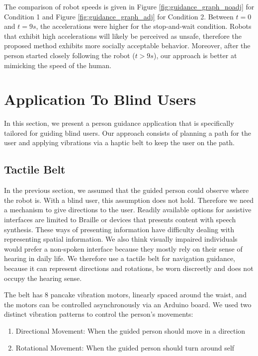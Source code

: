 The comparison of robot speeds is given in Figure \ref{fig:guidance_graph_noadj} for Condition 1 and Figure \ref{fig:guidance_graph_adj} for Condition 2. Between $t=0$ and $t=9s$, the accelerations were higher for the stop-and-wait condition. Robots that exhibit high accelerations will likely be perceived as unsafe, therefore the proposed method exhibits more socially acceptable behavior. Moreover, after the person started closely following the robot ($t >9s$), our approach is better at mimicking the speed of the human.


\section{Application To Blind Users}
\label{sec:guidance_blind_users}

In this section, we present a person guidance application that is specifically tailored for guiding blind users. Our approach consists of planning a path for the user and applying vibrations via a haptic belt to keep the user on the path.


\subsection{Tactile Belt}

In the previous section, we assumed that the guided person could observe where the robot is. With a blind user, this assumption does not hold. Therefore we need a mechanism to give directions to the user. Readily available options for assistive interfaces are limited to Braille or devices that presents content with speech synthesis. These ways of presenting information have difficulty dealing with representing spatial information. We also think visually impaired individuals would prefer a non-spoken interface because they mostly rely on their sense of hearing in daily life. We therefore use a tactile belt for navigation guidance, because it can represent directions and rotations, be worn discreetly and does not occupy the hearing sense.

The belt has 8 pancake vibration motors, linearly spaced around the waist, and the motors can be controlled asynchronously via an Arduino board. We used two distinct vibration patterns to control the person's movements:

\begin{enumerate}
\item Directional Movement: When the guided person should move in a direction
\item Rotational Movement: When the guided person should turn around self
\end{enumerate}

